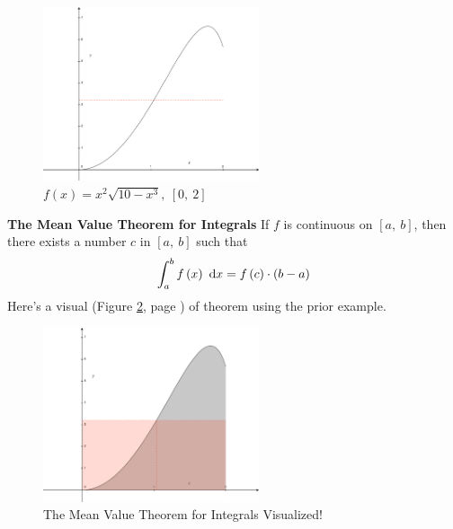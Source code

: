 \documentclass[12pt,addpoints, answers, fleqn]{exam}
\begin{document}
\begin{figure}[htbp] %
   \centering
   \includegraphics[width=2.5in]{./graphics/graph3121.pdf} 
   \caption{$\displaystyle f \left( x \right) = x^2 \sqrt{10 - x^3}, \ \left[ 0, \ 2 \right]$}
   \label{fig:graph3121}
\end{figure}

\textbf{The Mean Value Theorem for Integrals} If $f$ is continuous on $\left[ a, \ b \right]$, then there exists a number $c$ in $\left[ a, \ b \right]$ such that
\[
\int_a^b f \left( x \right) \ {\rm{d}}x = f\left( c \right) \cdot \left( b - a \right)
\]
Here's a visual (Figure \ref{fig:graph3122}, page \pageref{fig:graph3122}) of theorem using the prior example.
\begin{figure}[htbp] %
   \centering
   \includegraphics[width=2.5in]{./graphics/graph3122.pdf} 
   \caption{The Mean Value Theorem for Integrals Visualized!}
   \label{fig:graph3122}
\end{figure}
\end{document}
